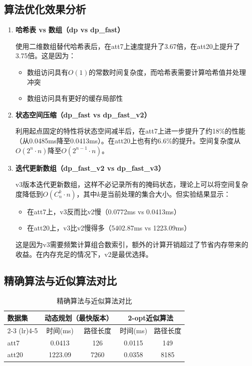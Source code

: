 \documentclass[UTF8,12pt,a4paper]{ctexart}
\begin{document}
\subsection{算法优化效果分析}

\begin{enumerate}
	\item \textbf{哈希表 vs 数组（dp vs dp\_fast）}
	
	使用二维数组替代哈希表后，在att7上速度提升了3.67倍，在att20上提升了3.75倍。这是因为：
	\begin{itemize}
		\item 数组访问具有$O(1)$的常数时间复杂度，而哈希表需要计算哈希值并处理冲突
		\item 数组访问具有更好的缓存局部性
	\end{itemize}
	
	\item \textbf{状态空间压缩（dp\_fast vs dp\_fast\_v2）}
	
	利用起点固定的特性将状态空间减半后，在att7上进一步提升了约18\%的性能（从0.0485ms降至0.0413ms）。在att20上也有约6.6\%的提升。空间复杂度从$O(2^n \cdot n)$降至$O(2^{n-1} \cdot n)$。
	
	\item \textbf{迭代更新数组（dp\_fast\_v2 vs dp\_fast\_v3）}
	
	v3版本迭代更新数组，这样不必记录所有的掩码状态，理论上可以将空间复杂度降低到$O(C_n^k \cdot n)$，其中$k$是当前处理的集合大小。但实验结果显示：
	\begin{itemize}
		\item 在att7上，v3反而比v2慢（0.0772ms vs 0.0413ms）
		\item 在att20上，v3比v2慢得多（5402.87ms vs 1223.09ms）
	\end{itemize}
	
	这是因为v3需要频繁计算组合数索引，额外的计算开销超过了节省内存带来的收益。在内存充足的情况下，v2是最优选择。
\end{enumerate}

\subsection{精确算法与近似算法对比}

\begin{table}[H]
	\centering
	\begin{tabular}{lcccc}
		\toprule
		\multirow{2}{*}{数据集} & \multicolumn{2}{c}{动态规划（最快版本）} & \multicolumn{2}{c}{2-opt近似算法} \\
		\cmidrule(lr){2-3} \cmidrule(lr){4-5}
		& 时间(ms) & 路径长度 & 时间(ms) & 路径长度 \\
		\midrule
		att7 & 0.0413 & 126 & 0.0115 & 149 \\
		att20 & 1223.09 & 7260 & 0.0358 & 8185 \\
		\bottomrule
	\end{tabular}
	\caption{精确算法与近似算法对比}
\end{table}
\end{document}
